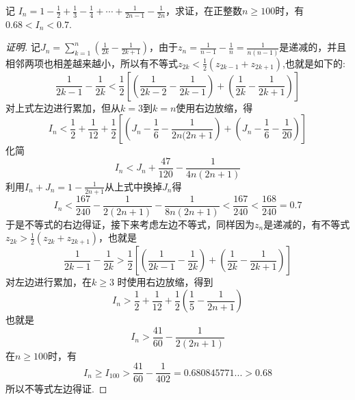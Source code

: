 \begin{exercise}
  记 $I_n=1-\frac{1}{2}+\frac{1}{3}-\frac{1}{4}+\cdots+\frac{1}{2n-1}-\frac{1}{2n}$，求证，在正整数$n\geqslant 100$时，有$0.68<I_{n}<0.7$.
\end{exercise}
\begin{proof}[证明]
  记$J_n=\sum_{k=1}^n(\frac{1}{2k}-\frac{1}{2k+1})$，由于$z_n=\frac{1}{n-1}-\frac{1}{n}=\frac{1}{n(n-1)}$是递减的，并且相邻两项也相差越来越小，所以有不等式$z_{2k}<\frac{1}{2}(z_{2k-1}+z_{2k+1})$,也就是如下的:
\begin{equation*}
  \frac{1}{2k-1} - \frac{1}{2k} < \frac{1}{2} \left[ \left( \frac{1}{2k-2} - \frac{1}{2k-1} \right) + \left( \frac{1}{2k} - \frac{1}{2k+1} \right) \right]
\end{equation*}
对上式左边进行累加，但从$k=3$到$k=n$使用右边放缩，得
\begin{equation*}
  I_n<\frac{1}{2}+\frac{1}{12}+\frac{1}{2} \left[ \left( J_n-\frac{1}{6}-\frac{1}{2n(2n+1} \right) + \left( J_n-\frac{1}{6}-\frac{1}{20} \right) \right]
\end{equation*}
化简
\begin{equation*}
 I_n<J_n+\frac{47}{120} - \frac{1}{4n(2n+1)}
\end{equation*}
利用$I_n+J_n=1-\frac{1}{2n+1}$从上式中换掉$J_n$得
\begin{equation}
  \label{eq:sign-sum-reciprocal-positive-integer-max}
  I_n<\frac{167}{240}-\frac{1}{2(2n+1)}-\frac{1}{8n(2n+1)}<\frac{167}{240}<\frac{168}{240}=0.7
\end{equation}
于是不等式的右边得证，接下来考虑左边不等式，同样因为$z_n$是递减的，有不等式$z_{2k}>\frac{1}{2}(z_{2k}+z_{2k+1})$，也就是
\begin{equation*}
  \frac{1}{2k-1} - \frac{1}{2k} > \frac{1}{2} \left[ \left( \frac{1}{2k-1} - \frac{1}{2k} \right) + \left( \frac{1}{2k} - \frac{1}{2k+1} \right) \right]
\end{equation*}
对左边进行累加，在$k \geqslant 3$ 时使用右边放缩，得到
\begin{equation*}
  I_n > \frac{1}{2} + \frac{1}{12} + \frac{1}{2} \left( \frac{1}{5} - \frac{1}{2n+1} \right)
\end{equation*}
也就是
\begin{equation}
  \label{eq:sign-sum-reciprocal-positive-integer-min}
 I_n > \frac{41}{60} -\frac{1}{2(2n+1)} 
\end{equation}
在$n \geqslant 100$时，有
\begin{equation*}
  I_{n} \geqslant I_{100} > \frac{41}{60} - \frac{1}{402} = 0.680845771... > 0.68
\end{equation*}
所以不等式左边得证.


\end{proof}

